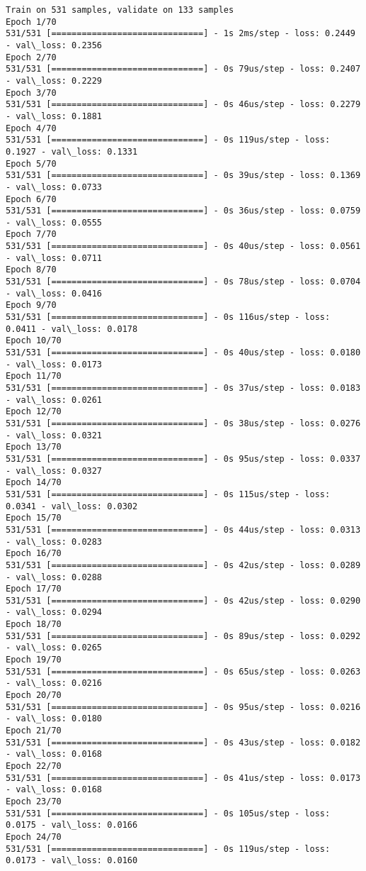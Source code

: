 \documentclass[11pt]{article}
\begin{document}
    \begin{Verbatim}[commandchars=\\\{\}]
Train on 531 samples, validate on 133 samples
Epoch 1/70
531/531 [==============================] - 1s 2ms/step - loss: 0.2449 - val\_loss: 0.2356
Epoch 2/70
531/531 [==============================] - 0s 79us/step - loss: 0.2407 - val\_loss: 0.2229
Epoch 3/70
531/531 [==============================] - 0s 46us/step - loss: 0.2279 - val\_loss: 0.1881
Epoch 4/70
531/531 [==============================] - 0s 119us/step - loss: 0.1927 - val\_loss: 0.1331
Epoch 5/70
531/531 [==============================] - 0s 39us/step - loss: 0.1369 - val\_loss: 0.0733
Epoch 6/70
531/531 [==============================] - 0s 36us/step - loss: 0.0759 - val\_loss: 0.0555
Epoch 7/70
531/531 [==============================] - 0s 40us/step - loss: 0.0561 - val\_loss: 0.0711
Epoch 8/70
531/531 [==============================] - 0s 78us/step - loss: 0.0704 - val\_loss: 0.0416
Epoch 9/70
531/531 [==============================] - 0s 116us/step - loss: 0.0411 - val\_loss: 0.0178
Epoch 10/70
531/531 [==============================] - 0s 40us/step - loss: 0.0180 - val\_loss: 0.0173
Epoch 11/70
531/531 [==============================] - 0s 37us/step - loss: 0.0183 - val\_loss: 0.0261
Epoch 12/70
531/531 [==============================] - 0s 38us/step - loss: 0.0276 - val\_loss: 0.0321
Epoch 13/70
531/531 [==============================] - 0s 95us/step - loss: 0.0337 - val\_loss: 0.0327
Epoch 14/70
531/531 [==============================] - 0s 115us/step - loss: 0.0341 - val\_loss: 0.0302
Epoch 15/70
531/531 [==============================] - 0s 44us/step - loss: 0.0313 - val\_loss: 0.0283
Epoch 16/70
531/531 [==============================] - 0s 42us/step - loss: 0.0289 - val\_loss: 0.0288
Epoch 17/70
531/531 [==============================] - 0s 42us/step - loss: 0.0290 - val\_loss: 0.0294
Epoch 18/70
531/531 [==============================] - 0s 89us/step - loss: 0.0292 - val\_loss: 0.0265
Epoch 19/70
531/531 [==============================] - 0s 65us/step - loss: 0.0263 - val\_loss: 0.0216
Epoch 20/70
531/531 [==============================] - 0s 95us/step - loss: 0.0216 - val\_loss: 0.0180
Epoch 21/70
531/531 [==============================] - 0s 43us/step - loss: 0.0182 - val\_loss: 0.0168
Epoch 22/70
531/531 [==============================] - 0s 41us/step - loss: 0.0173 - val\_loss: 0.0168
Epoch 23/70
531/531 [==============================] - 0s 105us/step - loss: 0.0175 - val\_loss: 0.0166
Epoch 24/70
531/531 [==============================] - 0s 119us/step - loss: 0.0173 - val\_loss: 0.0160

\end{Verbatim}
\end{document}
